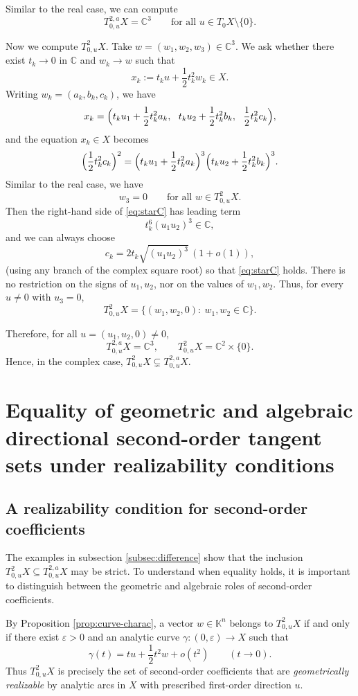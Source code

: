 \documentclass[10pt,reqno]{amsart}
\theoremstyle{break-italic}
\theoremstyle{break-italic}
\theoremstyle{break-italic}
\theoremstyle{break-italic}
\theoremstyle{break-italic}
\theoremstyle{break-italic}
\theoremstyle{break-italic}
\theoremstyle{break-italic}
\theoremstyle{break-roman}
\theoremstyle{standard}
\theoremstyle{varthm-roman}
\theoremstyle{varthm-italic}
\theoremstyle{varthm-roman-break}
\theoremstyle{varthm-italic-break}
\theoremstyle{varthm-roman-no-punctuation}
\theoremstyle{varthm-italic-no-punctuation}
\numberwithin{equation}{section}
\begin{document}
Similar to the real case, we can compute
\[
T^{2,a}_{0,u}X=\mathbb C^{3}\qquad \text{for all }u\in T_{0}X\setminus\{0\}.
\]

Now we compute \(T^{2}_{0,u}X\). Take \(w=(w_{1},w_{2},w_{3})\in\mathbb C^{3}\). We ask whether there exist \(t_{k}\to 0\) in \(\mathbb C\) and
\(w_{k}\to w\) such that
\[
x_{k}:=t_{k}u+\frac12 t_{k}^{2}w_{k}\in X.
\]
Writing \(w_{k}=(a_{k},b_{k},c_{k})\), we have
\[
x_{k}=\Bigl(t_{k}u_{1}+\frac12 t_{k}^{2}a_{k},\ \ t_{k}u_{2}+\frac12 t_{k}^{2}b_{k},\ \ \frac12 t_{k}^{2}c_{k}\Bigr),
\]
and the equation \(x_{k}\in X\) becomes
\begin{equation}\label{eq:starC}
\Bigl(\frac12 t_{k}^{2}c_{k}\Bigr)^{2}
=
\Bigl(t_{k}u_{1}+\frac12 t_{k}^{2}a_{k}\Bigr)^{3}
\Bigl(t_{k}u_{2}+\frac12 t_{k}^{2}b_{k}\Bigr)^{3}.
\end{equation}
Similar to the real case, we have 
\[
w_{3}=0\qquad\text{for all } w\in T^{2}_{0,u}X.
\]
Then the right-hand side of \eqref{eq:starC} has leading term
\[
t_{k}^{6}(u_{1}u_{2})^{3}\in\mathbb C,
\]
and we can always choose
\[
c_{k}=2t_{k}\sqrt{(u_{1}u_{2})^{3}}\,(1+o(1)),
\]
(using any branch of the complex square root) so that \eqref{eq:starC} holds.
There is no restriction on the signs of \(u_{1},u_{2}\), nor on the values of \(w_{1},w_{2}\). Thus, for every \(u\neq 0\) with \(u_{3}=0\),
\[
T^{2}_{0,u}X=\{(w_{1},w_{2},0):\ w_{1},w_{2}\in\mathbb C\}.
\]

Therefore, for all \(u=(u_{1},u_{2},0)\neq 0\),
\[
T^{2,a}_{0,u}X=\mathbb C^{3},
\qquad
T^{2}_{0,u}X=\mathbb C^{2}\times\{0\}.
\]
Hence, in the complex case, $
T^{2}_{0,u}X \subsetneq T^{2,a}_{0,u}X.$


\section{Equality of geometric and algebraic directional second-order tangent sets under realizability conditions} \label{sec:equality}
\subsection{A realizability condition for second-order coefficients}
The examples in subsection \ref{subsec:difference} show that the inclusion
\(
T^2_{0,u}X \subseteq T^{2,a}_{0,u}X
\)
may be strict. To understand when equality holds, it is important to distinguish
between the geometric and algebraic roles of second-order coefficients.

By Proposition \ref{prop:curve-charac}, a vector $w\in \mathbb K^n$ belongs to
$T^2_{0,u}X$ if and only if there exist $\varepsilon>0$ and an analytic curve
\(
\gamma:(0,\varepsilon)\to X
\)
such that
\[
\gamma(t)=tu+\frac12 t^2w+o(t^2)
\qquad (t\to 0).
\]
Thus $T^2_{0,u}X$ is precisely the set of second-order coefficients that are
\emph{geometrically realizable} by analytic arcs in $X$ with prescribed
first-order direction $u$.
\end{document}
